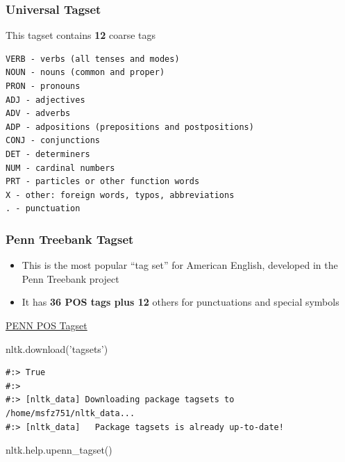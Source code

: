 \documentclass[
]{book}
\newenvironment{Shaded}{\begin{snugshade}}{\end{snugshade}}
\newcommand{\BuiltInTok}[1]{#1}
\newcommand{\NormalTok}[1]{#1}
\newcommand{\StringTok}[1]{\textcolor[rgb]{0.5,0.5,0.5}{#1}}
\providecommand{\tightlist}{%
  \setlength{\itemsep}{0pt}\setlength{\parskip}{0pt}}
\begin{document}
\hypertarget{universal-tagset}{%
\subsubsection{Universal Tagset}\label{universal-tagset}}

This tagset contains \textbf{12} coarse tags

\begin{verbatim}
VERB - verbs (all tenses and modes)
NOUN - nouns (common and proper)
PRON - pronouns
ADJ - adjectives
ADV - adverbs
ADP - adpositions (prepositions and postpositions)
CONJ - conjunctions
DET - determiners
NUM - cardinal numbers
PRT - particles or other function words
X - other: foreign words, typos, abbreviations
. - punctuation
\end{verbatim}

\hypertarget{penn-treebank-tagset}{%
\subsubsection{Penn Treebank Tagset}\label{penn-treebank-tagset}}

\begin{itemize}
\tightlist
\item
  This is the most popular ``tag set'' for American English, developed in the Penn Treebank project\\
\item
  It has \textbf{36 POS tags plus 12} others for punctuations and special symbols
\end{itemize}

\href{https://www.sketchengine.eu/penn-treebank-tagset/}{PENN POS Tagset}

\begin{Shaded}
\begin{Highlighting}[]
\NormalTok{nltk.download(}\StringTok{'tagsets'}\NormalTok{)}
\end{Highlighting}
\end{Shaded}

\begin{verbatim}
#:> True
#:> 
#:> [nltk_data] Downloading package tagsets to /home/msfz751/nltk_data...
#:> [nltk_data]   Package tagsets is already up-to-date!
\end{verbatim}

\begin{Shaded}
\begin{Highlighting}[]
\NormalTok{nltk.}\BuiltInTok{help}\NormalTok{.upenn_tagset()}
\end{Highlighting}
\end{Shaded}
\end{document}
